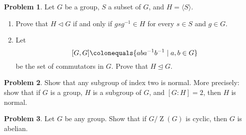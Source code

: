 \documentclass[11pt]{article}
\def\norm{\mathrel{\unlhd}}
\def\norm{\mathrel{\unlhd}}
\DeclareMathOperator{\Z}{Z}
\theoremstyle{definition}
\newtheorem{problem}{Problem}
\begin{document}
\begin{problem}
Let $G$ be a group, $S$ a subset of $G$, and $H=\langle S \rangle$.  

\begin{enumerate}[label=(4.\arabic*)]
\item Prove that $H\triangleleft G$ if and only if $gsg^{-1}\in H$ for every $s\in S$ and $g\in G$.

\item Let 
$$[G,G] \colonequals \{aba^{-1}b^{-1}\mid a,b\in G\}$$ 
be the set of commutators in $G$.
Prove that $H \norm G$.


\end{enumerate}
\end{problem}





\begin{problem}
Show that any subgroup of index two is normal. More precisely: show that if $G$ is a group, $H$ is a subgroup of $G$, and $[G:H]=2$, then $H$ is normal.	
\end{problem}




\begin{problem}
	Let $G$ be any group. Show that if $G/\Z(G)$ is cyclic, then $G$ is abelian.
\end{problem} 
\end{document}
